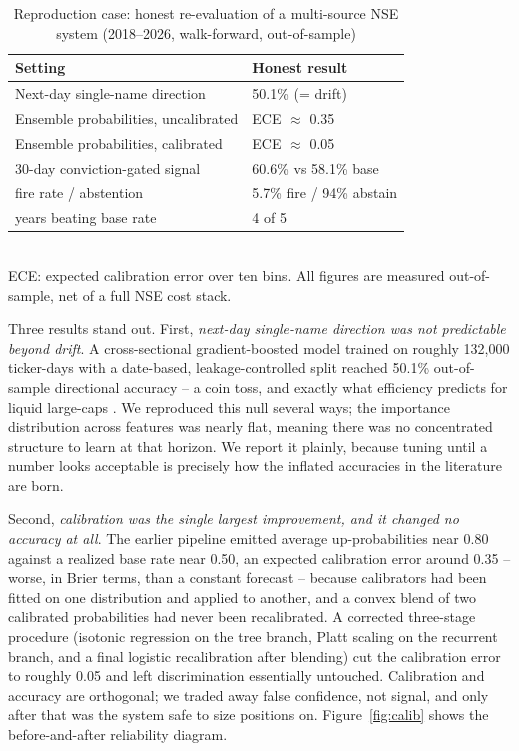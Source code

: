 \documentclass[10pt,a4paper,twocolumn]{article}
\begin{document}
\begin{table}[tb]
\centering
\caption{Reproduction case: honest re-evaluation of a multi-source NSE system (2018--2026, walk-forward, out-of-sample)}
\label{tab:repro}
{\footnotesize
\begin{tabular}{p{4.1cm} p{2.9cm}}
\toprule
\textbf{Setting} & \textbf{Honest result} \\
\midrule
Next-day single-name direction & 50.1\% (= drift) \\
Ensemble probabilities, uncalibrated & ECE $\approx$ 0.35 \\
Ensemble probabilities, calibrated & ECE $\approx$ 0.05 \\
30-day conviction-gated signal & 60.6\% vs 58.1\% base \\
\quad fire rate / abstention & 5.7\% fire / 94\% abstain \\
\quad years beating base rate & 4 of 5 \\
\bottomrule
\end{tabular}}
\vspace{2pt}
{\scriptsize \\ ECE: expected calibration error over ten bins. All figures are measured out-of-sample, net of a full NSE cost stack.}
\end{table}

Three results stand out. First, \textit{next-day single-name direction was not predictable beyond drift}. A cross-sectional gradient-boosted model trained on roughly 132{,}000 ticker-days with a date-based, leakage-controlled split reached 50.1\% out-of-sample directional accuracy -- a coin toss, and exactly what efficiency predicts for liquid large-caps \cite{fama1970}. We reproduced this null several ways; the importance distribution across features was nearly flat, meaning there was no concentrated structure to learn at that horizon. We report it plainly, because tuning until a number looks acceptable is precisely how the inflated accuracies in the literature are born.

Second, \textit{calibration was the single largest improvement, and it changed no accuracy at all}. The earlier pipeline emitted average up-probabilities near 0.80 against a realized base rate near 0.50, an expected calibration error around 0.35 -- worse, in Brier terms, than a constant forecast -- because calibrators had been fitted on one distribution and applied to another, and a convex blend of two calibrated probabilities had never been recalibrated. A corrected three-stage procedure (isotonic regression on the tree branch, Platt scaling on the recurrent branch, and a final logistic recalibration after blending) cut the calibration error to roughly 0.05 and left discrimination essentially untouched. Calibration and accuracy are orthogonal; we traded away false confidence, not signal, and only after that was the system safe to size positions on. Figure~\ref{fig:calib} shows the before-and-after reliability diagram.
\end{document}
